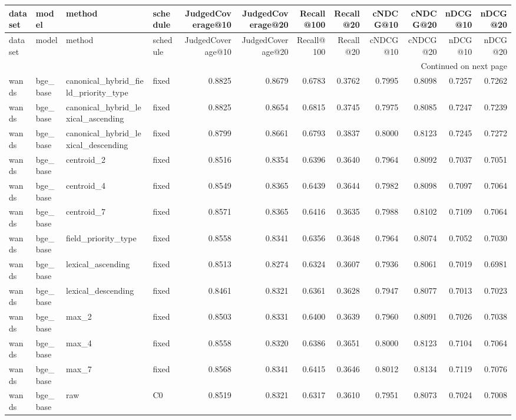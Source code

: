 \begin{longtable}{llllrrrrrrrr}
\toprule
dataset & model & method & schedule & JudgedCoverage@10 & JudgedCoverage@20 & Recall@100 & Recall@20 & cNDCG@10 & cNDCG@20 & nDCG@10 & nDCG@20 \\
\midrule
\endfirsthead
\toprule
dataset & model & method & schedule & JudgedCoverage@10 & JudgedCoverage@20 & Recall@100 & Recall@20 & cNDCG@10 & cNDCG@20 & nDCG@10 & nDCG@20 \\
\midrule
\endhead
\midrule
\multicolumn{12}{r}{Continued on next page} \\
\midrule
\endfoot
\bottomrule
\endlastfoot
wands & bge\_base & canonical\_hybrid\_field\_priority\_type & fixed & 0.8825 & 0.8679 & 0.6783 & 0.3762 & 0.7995 & 0.8098 & 0.7257 & 0.7262 \\
wands & bge\_base & canonical\_hybrid\_lexical\_ascending & fixed & 0.8825 & 0.8654 & 0.6815 & 0.3745 & 0.7975 & 0.8085 & 0.7247 & 0.7239 \\
wands & bge\_base & canonical\_hybrid\_lexical\_descending & fixed & 0.8799 & 0.8661 & 0.6793 & 0.3837 & 0.8000 & 0.8123 & 0.7245 & 0.7272 \\
wands & bge\_base & centroid\_2 & fixed & 0.8516 & 0.8354 & 0.6396 & 0.3640 & 0.7964 & 0.8092 & 0.7037 & 0.7051 \\
wands & bge\_base & centroid\_4 & fixed & 0.8549 & 0.8365 & 0.6439 & 0.3644 & 0.7982 & 0.8098 & 0.7097 & 0.7064 \\
wands & bge\_base & centroid\_7 & fixed & 0.8571 & 0.8365 & 0.6416 & 0.3635 & 0.7988 & 0.8102 & 0.7109 & 0.7064 \\
wands & bge\_base & field\_priority\_type & fixed & 0.8558 & 0.8341 & 0.6356 & 0.3648 & 0.7964 & 0.8074 & 0.7052 & 0.7030 \\
wands & bge\_base & lexical\_ascending & fixed & 0.8513 & 0.8274 & 0.6324 & 0.3607 & 0.7936 & 0.8061 & 0.7019 & 0.6981 \\
wands & bge\_base & lexical\_descending & fixed & 0.8461 & 0.8321 & 0.6361 & 0.3628 & 0.7947 & 0.8077 & 0.7013 & 0.7023 \\
wands & bge\_base & max\_2 & fixed & 0.8503 & 0.8331 & 0.6400 & 0.3639 & 0.7960 & 0.8091 & 0.7026 & 0.7038 \\
wands & bge\_base & max\_4 & fixed & 0.8558 & 0.8320 & 0.6386 & 0.3651 & 0.8000 & 0.8123 & 0.7104 & 0.7064 \\
wands & bge\_base & max\_7 & fixed & 0.8568 & 0.8341 & 0.6415 & 0.3646 & 0.8012 & 0.8134 & 0.7119 & 0.7076 \\
wands & bge\_base & raw & C0 & 0.8519 & 0.8321 & 0.6317 & 0.3610 & 0.7951 & 0.8073 & 0.7024 & 0.7008 \\

\end{longtable}
